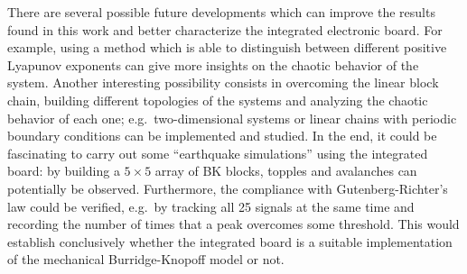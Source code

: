 
There are several possible future developments which can improve the results found in this work and
better characterize the integrated electronic board. For example, using a method which is able to
distinguish between different positive Lyapunov exponents can give more insights on the chaotic behavior
of the system. Another interesting possibility consists in overcoming the linear block chain, building
different topologies of the systems and analyzing the chaotic behavior of each one; e.g.\ two-dimensional
systems or linear chains with periodic boundary conditions can be implemented and studied. In the end,
it could be fascinating to carry out some ``earthquake simulations'' using the integrated board:
by building a $5\times5$ array of BK blocks, topples and avalanches can potentially be observed.
Furthermore, the compliance with Gutenberg-Richter's law could be verified, e.g.\ by tracking all
25 signals at the same time and recording the number of times that a peak overcomes some threshold.
This would establish conclusively whether the integrated board is a suitable implementation of the
mechanical Burridge-Knopoff model or not.










